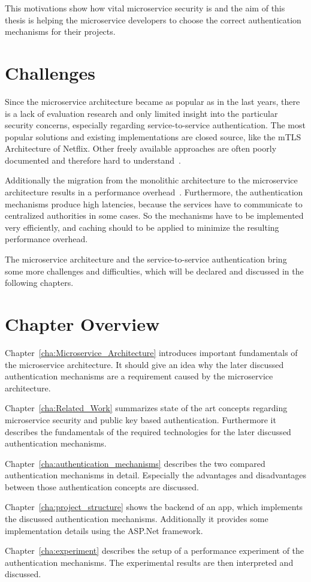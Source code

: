 This motivations show how vital microservice security is and the aim of this thesis is helping the microservice developers to choose the correct authentication mechanisms for their projects.

\section{Challenges}
Since the microservice architecture became as popular as in the last years, there is a lack of evaluation research and only limited insight into the particular security concerns, especially regarding service-to-service authentication. 
The most popular solutions and existing implementations are closed source, like the mTLS Architecture of Netflix.
Other freely available approaches are often poorly documented and therefore hard to understand~\cite{yarygina2018overcoming}.

Additionally the migration from the monolithic architecture to the microservice architecture results in a performance overhead~\cite{ueda2016workload}.
Furthermore, the authentication mechanisms produce high latencies, because the services have to communicate to centralized authorities in some cases.
So the mechanisms have to be implemented very efficiently, and caching should to be applied to minimize the resulting performance overhead.

The microservice architecture and the service-to-service authentication bring some more challenges and difficulties, which will be declared and discussed in the following chapters.

\section{Chapter Overview}
Chapter~\ref{cha:Microservice_Architecture} introduces important fundamentals of the microservice architecture. 
It should give an idea why the later discussed authentication mechanisms are a requirement caused by the microservice architecture.

Chapter~\ref{cha:Related_Work} summarizes state of the art concepts regarding microservice security and public key based authentication.
Furthermore it describes the fundamentals of the required technologies for the later discussed authentication mechanisms.

Chapter~\ref{cha:authentication_mechanisms} describes the two compared authentication mechanisms in detail.
Especially the advantages and disadvantages between those authentication concepts are discussed.

Chapter~\ref{cha:project_structure} shows the backend of an app, which implements the discussed authentication mechanisms.
Additionally it provides some implementation details using the ASP.Net framework.

Chapter~\ref{cha:experiment} describes the setup of a performance experiment of the authentication mechanisms.
The experimental results are then interpreted and discussed.
